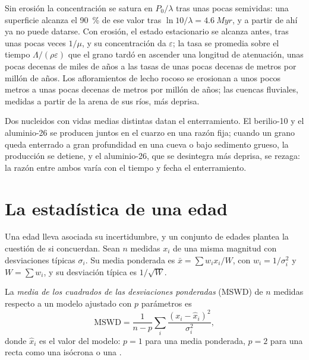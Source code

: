 Sin erosión la concentración se satura en $P_0/\lambda$ tras unas pocas
semividas: una superficie alcanza el \qty{90}{\percent} de ese valor tras $\ln 10/\lambda
= \qty{4.6}{Myr}$, y a partir de ahí ya no puede datarse. Con erosión,
el estado estacionario se alcanza antes, tras unas pocas veces $1/\mu$, y su
concentración da $\varepsilon$; la tasa se promedia sobre el tiempo
$\Lambda/(\rho\varepsilon)$ que el grano tardó en ascender una
longitud de atenuación, unas pocas decenas de miles de años a las tasas de unas
pocas decenas de metros por millón de años. Los afloramientos de lecho rocoso se erosionan a unos pocos metros
a unas pocas decenas de metros por millón de años; las cuencas fluviales, medidas a partir de la
arena de sus ríos, más deprisa.

Dos nucleidos con vidas medias distintas datan el enterramiento. El berilio-10 y el
aluminio-26 se producen juntos en el cuarzo en una razón fija; cuando un grano
queda enterrado a gran profundidad en una cueva o bajo sedimento grueso, la producción se detiene,
y el aluminio-26, que se desintegra más deprisa, se rezaga: la razón entre ambos
varía con el tiempo y fecha el enterramiento.

\section{La estadística de una edad}\label{sec:b3:advanced-geochronology:statistics}

Una edad lleva asociada su incertidumbre, y un conjunto de edades plantea la
cuestión de si concuerdan. Sean $n$ medidas $x_i$ de una misma magnitud con
desviaciones típicas $\sigma_i$. Su media ponderada es $\bar x = \sum w_ix_i/W$, con
$w_i = 1/\sigma_i^2$ y $W = \sum w_i$, y su desviación típica es
$1/\sqrt W$.

\begin{definition}\label{def:b3:advanced-geochronology:mswd}
La \emph{media de los cuadrados de las desviaciones ponderadas}
(MSWD) de $n$ medidas respecto a un modelo ajustado con $p$ parámetros
es
\[
\mathrm{MSWD} = \frac{1}{n - p}\sum_i \frac{(x_i - \hat x_i)^2}{\sigma_i^2},
\]
donde $\hat x_i$ es el valor del modelo: $p = 1$ para una media ponderada, $p = 2$ para
una recta como una isócrona o una .
\end{definition}

